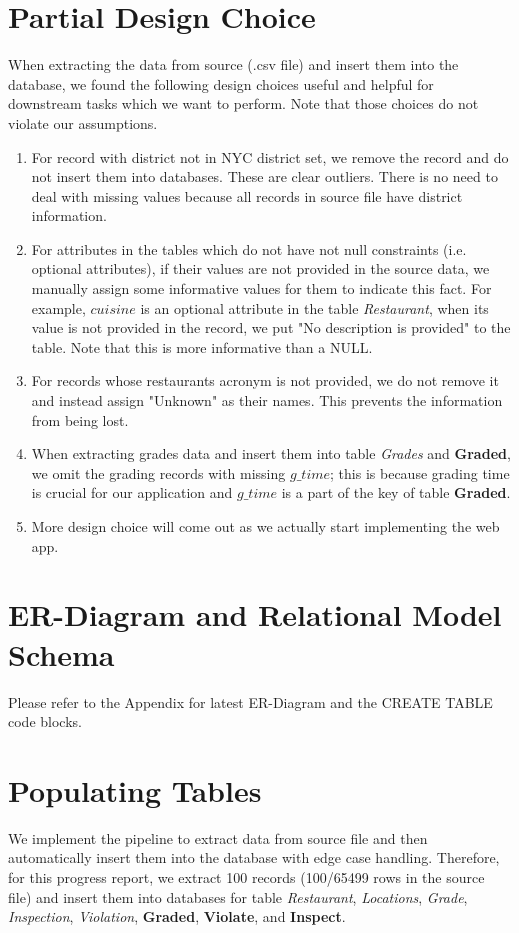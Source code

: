 \documentclass[a4paper,12pt]{article}
\theoremstyle{definition}
\begin{document}
\section{Partial Design Choice}
When extracting the data from source (.csv file) and insert them into the database, we found the following design choices useful and helpful for downstream tasks which we want to perform. Note that those choices do not violate our assumptions.
\begin{enumerate}
    \item For record with district not in NYC district set\footnotemark[1], we remove the record and do not insert them into databases. These are clear outliers. There is no need to deal with missing values because all records in source file have district information.
    \item For attributes in the tables which do not have not null constraints (i.e. optional attributes), if their values are not provided in the source data, we manually assign some informative values for them to indicate this fact. For example, $cuisine$ is an optional attribute in the table \textit{Restaurant}, when its value is not provided in the record, we put "No description is provided" to the table. Note that this is more informative than a NULL.
    \item For records whose restaurants acronym is not provided, we do not remove it and instead assign "Unknown" as their names. This prevents the information from being lost.
    \item When extracting grades data and insert them into table \textit{Grades} and \textbf{Graded}, we omit the grading records with missing $g\_time$; this is because grading time is crucial for our application and $g\_time$ is a part of the key of table \textbf{Graded}.
    \item More design choice will come out as we actually start implementing the web app.
\end{enumerate}
\section{ER-Diagram and Relational Model Schema}
Please refer to the Appendix for latest ER-Diagram and the CREATE TABLE code blocks.
\section{Populating Tables}
We implement the pipeline to extract data from source file and then automatically insert them into the database with edge case handling. Therefore, for this progress report, we extract 100 records (100/65499 rows in the source file) and insert them into databases for table \textit{Restaurant}, \textit{Locations}, \textit{Grade}, \textit{Inspection}, \textit{Violation}, \textbf{Graded}, \textbf{Violate}, and \textbf{Inspect}.
\end{document}
